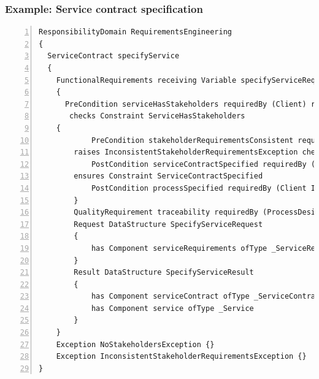 \begin{frame}[fragile]
\frametitle{Example: Service contract specification}

\lstset{language=urdad,label=serviceTextSyntax}
\begin{lstlisting}[numbers=left,escapechar=|]
ResponsibilityDomain RequirementsEngineering
{
  ServiceContract specifyService
  {
    FunctionalRequirements receiving Variable specifyServiceRequest ofType SpecifyServiceRequest
    {
      PreCondition serviceHasStakeholders requiredBy (Client) raises NoStakeholdersException
       checks Constraint ServiceHasStakeholders
	{
            PreCondition stakeholderRequirementsConsistent requiredBy (Client Implementation Testing)
		raises InconsistentStakeholderRequirementsException checks Constraint RequirementsConsistent
            PostCondition serviceContractSpecified requiredBy (Client Implementation Testing)
		ensures Constraint ServiceContractSpecified
            PostCondition processSpecified requiredBy (Client Implementation) ensures Constraint ProcessSpecified
        }
        QualityRequirement traceability requiredBy (ProcessDesign ProjectManagement Development)
        Request DataStructure SpecifyServiceRequest
        {
            has Component serviceRequirements ofType _ServiceRequirements
        }
        Result DataStructure SpecifyServiceResult
        {
            has Component serviceContract ofType _ServiceContract
            has Component service ofType _Service
        }
    }
    Exception NoStakeholdersException {}
    Exception InconsistentStakeholderRequirementsException {}
}
\end{lstlisting}
\end{frame}


